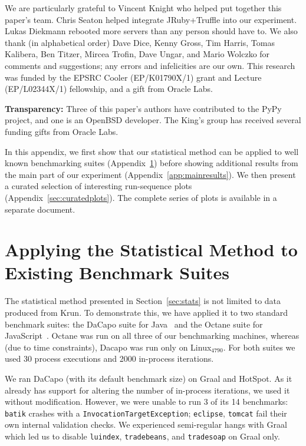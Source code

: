 \documentclass[acmsmall,screen]{acmart}
\newcommand{\bencherfive}{Linux$_\mathrm{4790}$\xspace}
\newcommand{\numpexecs}{30\xspace}
\newcommand{\numiterations}{2000\xspace}
\begin{document}
\begin{acks}
We are particularly grateful to Vincent Knight who helped put together this
paper's team. Chris Seaton helped integrate JRuby+Truffle into our experiment.
Lukas Diekmann rebooted more servers than any person should have to.
We also thank (in alphabetical order) Dave Dice, Kenny Gross, Tim Harris, Tomas Kalibera, Ben
Titzer, Mircea Trofin, Dave Ungar, and Mario Wolczko for comments and suggestions; any
errors and infelicities are our own. This research was funded by the EPSRC
Cooler (EP/K01790X/1) grant and Lecture (EP/L02344X/1) fellowship,
and a gift from Oracle Labs.

\textbf{Transparency:} Three of this paper's authors have contributed
to the PyPy project, and one is an OpenBSD developer. The
King's group has received several funding gifts from Oracle Labs.
\end{acks}





\clearpage

\appendix

\noindent In this appendix, we first show that our statistical method
can be applied to well known benchmarking suites (Appendix~\ref{sec:existing})
before showing additional results from the main part of our experiment
(Appendix~\ref{app:mainresults}). We
then present a curated selection of interesting run-sequence
plots (Appendix~\ref{sec:curatedplots}). The complete series of plots is available in a separate
document.


\section{Applying the Statistical Method to Existing Benchmark Suites}
\label{sec:existing}

The statistical method presented in Section~\ref{sec:stats} is not limited to data
produced from Krun. To demonstrate this, we have applied it to two standard
benchmark suites: the DaCapo suite for Java~\cite{dacapo06} and the Octane
suite for JavaScript~\cite{octane}. Octane was
run on all three of our benchmarking machines, whereas (due to time
constraints), Dacapo was run only on \bencherfive. For both suites we used
\numpexecs process executions and \numiterations in-process iterations.

We ran DaCapo (with its default benchmark size) on Graal and HotSpot. As it already has support for
altering the number of in-process iterations, we used it without modification.
However, we were unable to run 3 of its 14 benchmarks: \texttt{batik}
crashes with a \texttt{Invocation\-Target\-Exception}; \texttt{eclipse},
\texttt{tomcat} fail their own internal validation checks. We experienced
semi-regular hangs with Graal which led us to disable \texttt{luindex},
\texttt{tradebeans}, and \texttt{tradesoap} on Graal only.
\end{document}
